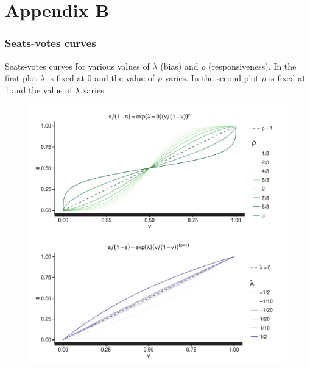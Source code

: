 \chapter*{Appendix B}\label{AppendixB}
\vspace{-1.75cm}

\subsection*{Seats-votes curves}

Seats-votes curves for various values of $\lambda$ (bias) and $\rho$ (responsiveness). 
In the first plot $\lambda$ is fixed at 0 and the value of $\rho$ varies. In the second plot 
$\rho$ is fixed at 1 and the value of $\lambda$ varies. 

\begin{figure}[h]
\centering
	\includegraphics[scale=0.8]{sections/figs/seats_votes}
\label{fig:seats_votes}
\end{figure}


